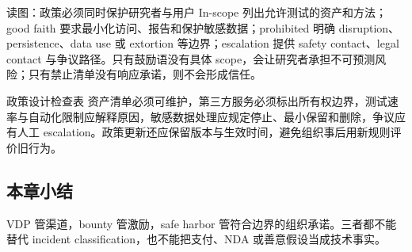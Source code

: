 
\begin{knowledgebox}{读图：政策必须同时保护研究者与用户}
In-scope 列出允许测试的资产和方法；good faith 要求最小化访问、报告和保护敏感数据；prohibited 明确 disruption、persistence、data use 或 extortion 等边界；escalation 提供 safety contact、legal contact 与争议路径。只有鼓励语没有具体 scope，会让研究者承担不可预测风险；只有禁止清单没有响应承诺，则不会形成信任。
\end{knowledgebox}

\begin{importantbox}{政策设计检查表}
资产清单必须可维护，第三方服务必须标出所有权边界，测试速率与自动化限制应解释原因，敏感数据处理应规定停止、最小保留和删除，争议应有人工 escalation。政策更新还应保留版本与生效时间，避免组织事后用新规则评价旧行为。
\end{importantbox}

\subsection{本章小结}

VDP 管渠道，bounty 管激励，safe harbor 管符合边界的组织承诺。三者都不能替代 incident classification，也不能把支付、NDA 或善意假设当成技术事实。

